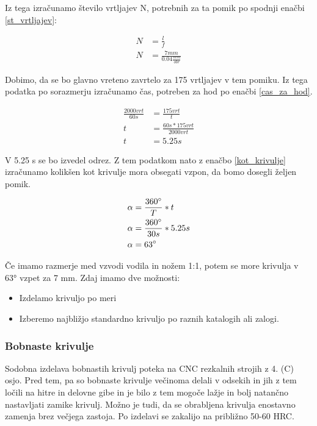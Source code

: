 Iz tega izračunamo število vrtljajev N, potrebnih za ta pomik po spodnji enačbi \ref{st_vrtljajev}:

\begin{equation}
    \label{st_vrtljajev}
    \begin{split}
        N &= \frac{l}{f} \\
        N &= \frac{7mm}{0.04\frac{mm}{obr}}
    \end{split}
\end{equation}

Dobimo, da se bo glavno vreteno zavrtelo za 175 vrtljajev v tem 
pomiku. Iz tega podatka po sorazmerju izračunamo čas, potreben 
za hod po enačbi \ref{cas_za_hod}.

\begin{equation}
    \label{cas_za_hod}
    \begin{split}
        \frac{2000vrt}{60s} &= \frac{175vrt}{t} \\
        t &= \frac{60s * 175vrt}{2000vrt} \\
        t &= 5.25s
    \end{split}
\end{equation}
 
V 5.25 s se bo izvedel odrez. Z tem podatkom nato z enačbo \ref{kot_krivulje} izračunamo 
kolikšen kot krivulje mora obsegati vzpon, da bomo dosegli željen pomik.

\begin{equation}
    \label{kot_krivulje}
    \begin{split}
        \alpha &= \frac{360\degree}{T} * t \\
        \alpha &= \frac{360\degree}{30s} * 5.25s \\
        \alpha &= 63\degree
    \end{split}    
\end{equation}

Če imamo razmerje med vzvodi vodila in nožem 1:1, potem se more krivulja v 63° vzpet za 7 mm.
Zdaj imamo dve možnosti:
\begin{itemize}
    \item Izdelamo krivuljo po meri
    \item Izberemo najbližjo standardno krivuljo po raznih katalogih ali zalogi.
\end{itemize}

\newpage
\subsubsection{Bobnaste krivulje}
Sodobna izdelava bobnastih krivulj poteka na CNC rezkalnih strojih 
z 4. (C) osjo. Pred tem, pa so bobnaste krivulje večinoma delali v
odsekih in jih z tem ločili na hitre in delovne gibe in je bilo z tem
mogoče lažje in bolj natančno nastavljati zamike krivulj.
Možno je tudi, da se obrabljena krivulja enostavno zamenja brez
večjega zastoja. Po izdelavi se zakalijo na približno 50-60 HRC.

